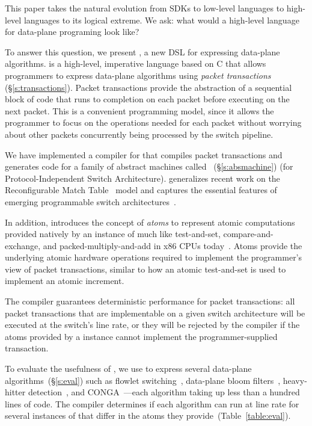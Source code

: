 This paper takes the natural evolution from SDKs to low-level languages to
high-level languages to its logical extreme. We ask: what would a high-level
language for data-plane programing look like?

To answer this question, we present \pktlanguage, a new DSL for expressing
data-plane algorithms. \pktlanguage is a high-level, imperative language based
on C that allows programmers to express data-plane algorithms using {\em packet
transactions} (\S\ref{s:transactions}).  Packet transactions provide the
abstraction of a sequential block of code that runs to completion on each
packet before executing on the next packet. This is a convenient programming
model, since it allows the programmer to focus on the operations needed for
each packet without worrying about other packets concurrently being processed
by the switch pipeline.

We have implemented a compiler for \pktlanguage that compiles \pktlanguage
packet transactions and generates code for a family of abstract machines called
\absmachine~(\S\ref{s:absmachine}) (for Protocol-Independent Switch
Architecture). \absmachine generalizes recent work on the Reconfigurable Match
Table~\cite{rmt} model and captures the essential features of emerging
programmable switch architectures~\cite{rmt, xpliant, flexpipe}.

In addition, \absmachine introduces the concept of {\em atoms} to represent
atomic computations provided natively by an instance of \absmachine much like
test-and-set, compare-and-exchange, and packed-multiply-and-add in x86 CPUs
today~\cite{x86_manual}.  Atoms provide the underlying atomic hardware
operations required to implement the programmer's view of packet transactions,
similar to how an atomic test-and-set is used to implement an atomic increment.

The \pktlanguage compiler guarantees deterministic performance for packet
transactions: all packet transactions that are implementable on a given switch
architecture will be executed at the switch's line rate, or they will be
rejected by the compiler if the atoms provided by a \absmachine instance cannot
implement the programmer-supplied transaction.

To evaluate the usefulness of \pktlanguage, we use \pktlanguage to express
several data-plane algorithms~(\S\ref{s:eval}) such as flowlet
switching~\cite{flowlets}, data-plane bloom filters~\cite{bloom}, heavy-hitter
detection~\cite{opensketch}, and CONGA~\cite{conga}---each algorithm taking
up less than a hundred lines of \pktlanguage code.  The \pktlanguage compiler
determines if each algorithm can run at line rate for several instances of
\absmachine that differ in the atoms they provide~(Table~\ref{table:eval}).
